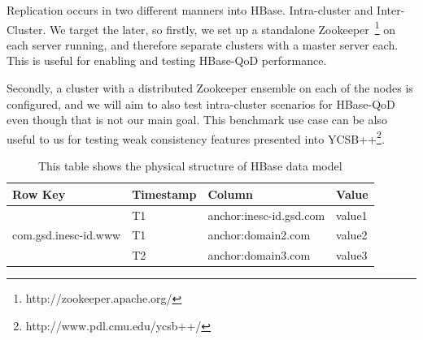 
Replication occurs in two different manners into HBase. Intra-cluster and Inter-Cluster. We target the later, so firstly, we set up a standalone Zookeeper~\footnote{http://zookeeper.apache.org/} on each server running, and therefore separate clusters with a master server each. This is useful for enabling and testing HBase-QoD performance.

Secondly, a cluster with a distributed Zookeeper ensemble on each of the nodes is configured, and we will aim to also test intra-cluster scenarios for HBase-QoD even though that is not our main goal. This benchmark use case can be also useful to us for testing weak consistency features presented into YCSB++\footnote{http://www.pdl.cmu.edu/ycsb++/}.


\begin{center}
\begin{table}\label{tab:hbase-model}
\centering
\begin{tabular}{ |l|l|l|l| }
\hline
Row Key & Timestamp & Column & Value \\ \hline
\multirow{3}{*}{com.gsd.inesc-id.www} & T1 & anchor:inesc-id.gsd.com & value1\\
 & T1 & anchor:domain2.com & value2\\
 & T2 & anchor:domain3.com & value3\\
 \hline
\end{tabular}
\caption{This table shows the physical structure of HBase data model}
\end{table}
\end{center}



